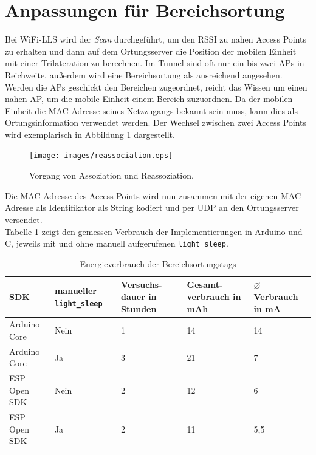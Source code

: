 \section{Anpassungen für Bereichsortung}
\label{ch:phase1:sec:anpassungbereich}
Bei WiFi-LLS wird der \emph{Scan} durchgeführt, um den RSSI zu nahen Access Points zu erhalten und dann auf dem Ortungsserver die Position der mobilen Einheit mit einer Trilateration zu berechnen.
Im Tunnel sind oft nur ein bis zwei APs in Reichweite, außerdem wird eine Bereichsortung als ausreichend angesehen. \\
Werden die APs geschickt den Bereichen zugeordnet, reicht das Wissen um einen nahen AP, um die mobile Einheit einem Bereich zuzuordnen.
Da der mobilen Einheit die MAC-Adresse seines Netzzugangs bekannt sein muss, kann dies als Ortungsinformation verwendet werden.
Der Wechsel zwischen zwei Access Points wird exemplarisch in Abbildung \ref{fig:reassociation} dargestellt.

\begin{figure}[h!]
  \centering
	\texttt{[image: images/reassociation.eps]}
  \caption{Vorgang von Assoziation und Reassoziation.}
  \label{fig:reassociation}
\end{figure}

Die MAC-Adresse des Access Points wird nun zusammen mit der eigenen MAC-Adresse als Identifikator als String kodiert und per UDP an den Ortungsserver versendet.\\
Tabelle \ref{table:naiveconsumption} zeigt den gemessen Verbrauch der Implementierungen in Arduino und C, jeweils mit und ohne manuell aufgerufenen \texttt{light\_sleep}.

\begin{table}[h]
	\centering
	\caption{Energieverbrauch der Bereichsortungstags}
	\label{table:naiveconsumption}
	\begin{tabular}{p{3cm}|p{2.2cm}|p{1.7cm}|p{2.5cm}|p{2.5cm}}
		SDK & manueller \texttt{light\_sleep} & Versuchs-dauer in Stunden & Gesamt-verbrauch in mAh & $\varnothing$ Verbrauch in mA \\
		\hline
		Arduino Core & Nein & 1 & 14 & 14 \\
		Arduino Core & Ja & 3 & 21 & 7 \\
		ESP Open SDK & Nein & 2 & 12 & 6 \\
		ESP Open SDK & Ja & 2 & 11 & 5,5 \\
	\end{tabular}
\end{table}

